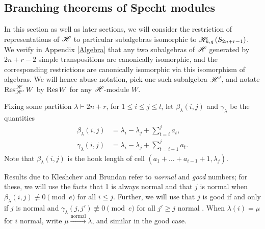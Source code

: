 \documentclass{amsart}
\begin{document}
  \subsection{Branching theorems of Specht modules}
  In this section as well as later sections, we will consider the restriction of representations of $\mathscr{H}$ to particular subalgebras isomorphic to $\mathscr{H}_{k,q}\left( S_{2n + r - 1} \right)$.
  We verify in Appendix \ref{Algebra} that any two subalgebras of $\mathscr{H}$ generated by $2n + r - 2$ simple transpositions are canonically isomorphic, and the corresponding restrictions are canonically isomorphic via this isomorphism of algebras.
  We will hence abuse notation, pick one such subalgebra $\mathscr{H}'$, and notate $\operatorname{Res}_{\mathscr{H}'}^{\mathscr{H}} W$ by $\operatorname{Res} W$ for any $\mathscr{H}$-module $W$.
  

  
  Fixing some partition $\lambda \vdash 2n + r$, for $1 \leq i \leq j \leq l$, let $\beta_\lambda(i,j)$ and $\gamma_\lambda$ be the quantities
  \begin{align*}
    \beta_\lambda(i,j) &= \lambda_i - \lambda_j + \sum_{t = i}^j a_t,\\
    \gamma_\lambda(i,j) &= \lambda_i - \lambda_j + \sum_{t = i+1}^j a_t.
  \end{align*}
  Note that $\beta_\lambda(i,j)$ is the hook length of cell $(a_1 + \dots + a_{i-1}+1,\lambda_j)$.

  Results due to Kleshchev and Brundan refer to \emph{normal} and \emph{good} numbers;
  for these, we will use the facts that 1 is always normal and that $j$ is normal when $\beta_\lambda(i,j) \not\equiv 0 \pmod e$ for all $i \leq j$.
  Further, we will use that $j$ is good if and only if $j$ is normal and $\gamma_\lambda(j,j') \not\equiv 0 \pmod e$ for all $j' \geq j$ normal \cite{Brundan,Kleshchev}.
  When $\lambda(i) = \mu$ for $i$ normal, write $\mu \xrightarrow{\text{normal}} \lambda$, and similar in the good case.
\end{document}

